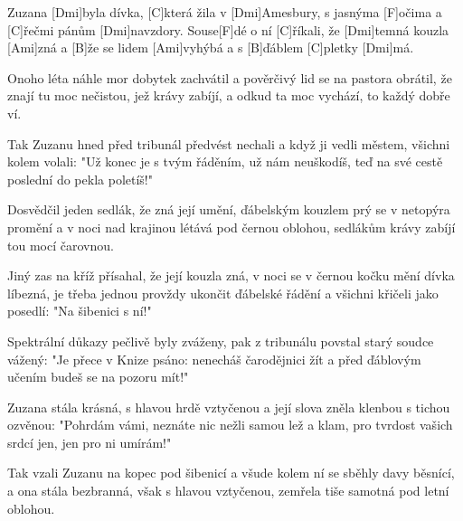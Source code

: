 
\sloka
Zuzana [Dmi]byla dívka, [C]která žila v [Dmi]Amesbury,
s jasnýma [F]očima a [C]řečmi pánům [Dmi]navzdory.
Souse[F]dé o ní [C]říkali, že [Dmi]temná kouzla [Ami]zná
a [B]že se lidem [Ami]vyhýbá a s [B]ďáblem [C]pletky [Dmi]má.

\sloka
Onoho léta náhle mor dobytek zachvátil
a pověrčivý lid se na pastora obrátil,
že znají tu moc nečistou, jež krávy zabíjí,
a odkud ta moc vychází, to každý dobře ví.

\sloka
Tak Zuzanu hned před tribunál předvést nechali
a když ji vedli městem, všichni kolem volali:
"Už konec je s tvým řáděním, už nám neuškodíš,
teď na své cestě poslední do pekla poletíš!"

\sloka
Dosvědčil jeden sedlák, že zná její umění,
ďábelským kouzlem prý se v netopýra promění
a v noci nad krajinou létává pod černou oblohou,
sedlákům krávy zabíjí tou mocí čarovnou.

\sloka
Jiný zas na kříž přísahal, že její kouzla zná,
v noci se v černou kočku mění dívka líbezná,
je třeba jednou provždy ukončit ďábelské řádění
a všichni křičeli jako posedlí: "Na šibenici s ní!"

\sloka
Spektrální důkazy pečlivě byly zváženy,
pak z tribunálu povstal starý soudce vážený:
"Je přece v Knize psáno: nenecháš čarodějnici žít
a před ďáblovým učením budeš se na pozoru mít!"

\sloka
Zuzana stála krásná, s hlavou hrdě vztyčenou
a její slova zněla klenbou s tichou ozvěnou:
"Pohrdám vámi, neznáte nic nežli samou lež a klam,
pro tvrdost vašich srdcí jen, jen pro ni umírám!"

\sloka
Tak vzali Zuzanu na kopec pod šibenicí
a všude kolem ní se sběhly davy běsnící,
a ona stála bezbranná, však s hlavou vztyčenou,
zemřela tiše samotná pod letní oblohou.
